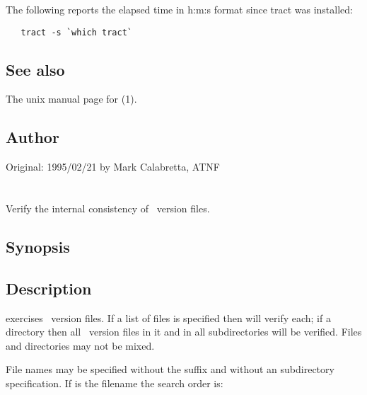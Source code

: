 The following reports the elapsed time in h:m:s format since tract was
installed:

\begin{verbatim}
   tract -s `which tract`
\end{verbatim}

\subsection*{See also}

The unix manual page for (1).

\subsection*{Author}

Original: 1995/02/21 by Mark Calabretta, ATNF


\newpage
\section{}
\label{xrcs}

Verify the internal consistency of \rcs\ version files.

\subsection*{Synopsis}

\begin{synopsis}
\end{synopsis}

\subsection*{Description}

 exercises \rcs\ version files.  If a list of files is specified
then  will verify each; if a directory then all \rcs\ version files
in it and in all subdirectories will be verified.  Files and directories may
not be mixed.

File names may be specified without the  suffix and without an
 subdirectory specification.  If  is the filename the
search order is:

